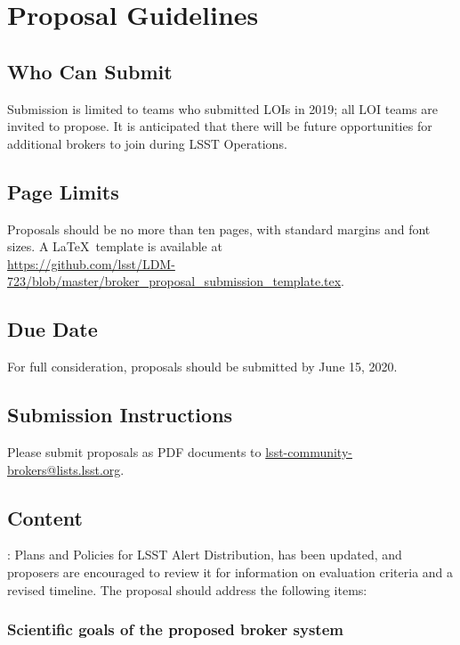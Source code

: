 \documentclass[DM,toc,lsstdraft]{lsstdoc}
\begin{document}
\section{Proposal Guidelines}

\subsection{Who Can Submit}

Submission is limited to teams who submitted LOIs in 2019; all LOI teams are invited to propose.
It is anticipated that there will be future opportunities for additional brokers to join during LSST Operations.

\subsection{Page Limits}

Proposals should be no more than ten pages, with standard margins and font sizes.
A \LaTeX\ template is available at \\
\url{https://github.com/lsst/LDM-723/blob/master/broker_proposal_submission_template.tex}.

\subsection{Due Date}

For full consideration, proposals should be submitted by June 15, 2020.

\subsection{Submission Instructions}

Please submit proposals as PDF documents to \url{lsst-community-brokers@lists.lsst.org}.

\subsection{Content}


: Plans and Policies for LSST Alert Distribution, has been updated, and proposers are encouraged to review it for information on evaluation criteria and a revised timeline.
The proposal should address the following items:

\subsubsection{Scientific goals of the proposed broker system}
\end{document}
